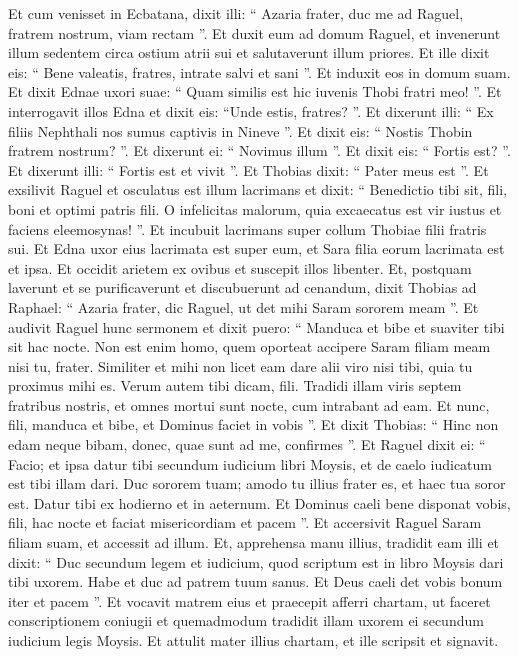 \begin{biblechapter}
\begin{biblechapter}
\begin{biblechapter}
\begin{biblechapter}
\begin{biblechapter}
\begin{biblechapter}
\begin{biblechapter}
\verse Et cum venisset in Ecbatana, dixit illi: “ Azaria frater, duc me ad Raguel, fratrem nostrum, viam rectam ”. Et duxit eum ad domum Raguel, et invenerunt illum sedentem circa ostium atrii sui et salutaverunt illum priores. Et ille dixit eis: “ Bene valeatis, fratres, intrate salvi et sani ”. Et induxit eos in domum suam. 
\verse Et dixit Ednae uxori suae: “ Quam similis est hic iuvenis Thobi fratri meo! ”. 
\verse Et interrogavit illos Edna et dixit eis: “Unde estis, fratres? ”. Et dixerunt illi: “ Ex filiis Nephthali nos sumus captivis in Nineve ”. 
\verse Et dixit eis: “ Nostis Thobin fratrem nostrum? ”. Et dixerunt ei: “ Novimus illum ”. Et dixit eis: “ Fortis est? ”. 
\verse Et dixerunt illi: “ Fortis est et vivit ”. Et Thobias dixit: “ Pater meus est ”. 
\verse Et exsilivit Raguel et osculatus est illum lacrimans 
\verse et dixit: “ Benedictio tibi sit, fili, boni et optimi patris fili. O infelicitas malorum, quia excaecatus est vir iustus et faciens eleemosynas! ”. Et incubuit lacrimans super collum Thobiae filii fratris sui. 
\verse Et Edna uxor eius lacrimata est super eum, et Sara filia eorum lacrimata est et ipsa. 
\verse Et occidit arietem ex ovibus et suscepit illos libenter. Et, postquam laverunt et se purificaverunt et discubuerunt ad cenandum, dixit Thobias ad Raphael: “ Azaria frater, dic Raguel, ut det mihi Saram sororem meam ”. 
\verse Et audivit Raguel hunc sermonem et dixit puero: “ Manduca et bibe et suaviter tibi sit hac nocte. Non est enim homo, quem oporteat accipere Saram filiam meam nisi tu, frater. Similiter et mihi non licet eam dare alii viro nisi tibi, quia tu proximus mihi es. Verum autem tibi dicam, fili. 
\verse Tradidi illam viris septem fratribus nostris, et omnes mortui sunt nocte, cum intrabant ad eam. Et nunc, fili, manduca et bibe, et Dominus faciet in vobis ”. Et dixit Thobias: “ Hinc non edam neque bibam, donec, quae sunt ad me, confirmes ”. Et Raguel dixit ei: “ Facio; et ipsa datur tibi secundum iudicium libri Moysis, et de caelo iudicatum est tibi illam dari. Duc sororem tuam; amodo tu illius frater es, et haec tua soror est. Datur tibi ex hodierno et in aeternum. Et Dominus caeli bene disponat vobis, fili, hac nocte et faciat misericordiam et pacem ”. 
\verse Et accersivit Raguel Saram filiam suam, et accessit ad illum. Et, apprehensa manu illius, tradidit eam illi et dixit: “ Duc secundum legem et iudicium, quod scriptum est in libro Moysis dari tibi uxorem. Habe et duc ad patrem tuum sanus. Et Deus caeli det vobis bonum iter et pacem ”. 
\verse Et vocavit matrem eius et praecepit afferri chartam, ut faceret conscriptionem coniugii et quemadmodum tradidit illam uxorem ei secundum iudicium legis Moysis. Et attulit mater illius chartam, et ille scripsit et signavit. 

\end{biblechapter}
\end{biblechapter}
\end{biblechapter}
\end{biblechapter}
\end{biblechapter}
\end{biblechapter}
\end{biblechapter}
